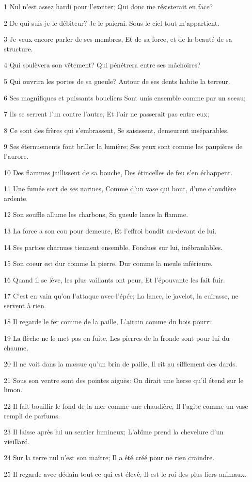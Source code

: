 \par 1 Nul n'est assez hardi pour l'exciter; Qui donc me résisterait en face?
\par 2 De qui suis-je le débiteur? Je le paierai. Sous le ciel tout m'appartient.
\par 3 Je veux encore parler de ses membres, Et de sa force, et de la beauté de sa structure.
\par 4 Qui soulèvera son vêtement? Qui pénétrera entre ses mâchoires?
\par 5 Qui ouvrira les portes de sa gueule? Autour de ses dents habite la terreur.
\par 6 Ses magnifiques et puissants boucliers Sont unis ensemble comme par un sceau;
\par 7 Ils se serrent l'un contre l'autre, Et l'air ne passerait pas entre eux;
\par 8 Ce sont des frères qui s'embrassent, Se saisissent, demeurent inséparables.
\par 9 Ses éternuements font briller la lumière; Ses yeux sont comme les paupières de l'aurore.
\par 10 Des flammes jaillissent de sa bouche, Des étincelles de feu s'en échappent.
\par 11 Une fumée sort de ses narines, Comme d'un vase qui bout, d'une chaudière ardente.
\par 12 Son souffle allume les charbons, Sa gueule lance la flamme.
\par 13 La force a son cou pour demeure, Et l'effroi bondit au-devant de lui.
\par 14 Ses parties charnues tiennent ensemble, Fondues sur lui, inébranlables.
\par 15 Son coeur est dur comme la pierre, Dur comme la meule inférieure.
\par 16 Quand il se lève, les plus vaillants ont peur, Et l'épouvante les fait fuir.
\par 17 C'est en vain qu'on l'attaque avec l'épée; La lance, le javelot, la cuirasse, ne servent à rien.
\par 18 Il regarde le fer comme de la paille, L'airain comme du bois pourri.
\par 19 La flèche ne le met pas en fuite, Les pierres de la fronde sont pour lui du chaume.
\par 20 Il ne voit dans la massue qu'un brin de paille, Il rit au sifflement des dards.
\par 21 Sous son ventre sont des pointes aiguës: On dirait une herse qu'il étend sur le limon.
\par 22 Il fait bouillir le fond de la mer comme une chaudière, Il l'agite comme un vase rempli de parfums.
\par 23 Il laisse après lui un sentier lumineux; L'abîme prend la chevelure d'un vieillard.
\par 24 Sur la terre nul n'est son maître; Il a été créé pour ne rien craindre.
\par 25 Il regarde avec dédain tout ce qui est élevé, Il est le roi des plus fiers animaux.

